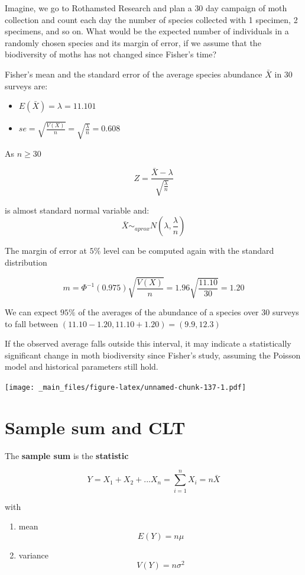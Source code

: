 \documentclass[
]{book}
\providecommand{\tightlist}{%
  \setlength{\itemsep}{0pt}\setlength{\parskip}{0pt}}
\begin{document}
Imagine, we go to Rothamsted Research and plan a \(30\) day campaign of moth collection and count each day the number of species collected with 1 specimen, 2 specimens, and so on. What would be the expected number of individuals in a randomly chosen species and its margin of error, if we assume that the biodiversity of moths has not changed since Fisher's time?

Fisher's mean and the standard error of the average species abundance \(\bar{X}\) in \(30\) surveys are:

\begin{itemize}
\tightlist
\item
  \(E(\bar{X})=\lambda=11.101\)
\item
  \(se=\sqrt{\frac{V(X)}{n}}=\sqrt{\frac{\lambda}{n}}=0.608\)
\end{itemize}

As \(n \geq 30\)

\[Z=\frac{\bar{X}-\lambda}{\sqrt{\frac{\lambda}{n}}}\]

is almost standard normal variable and: \[\bar{X} \sim_{aprox}  N(\lambda, \frac{\lambda}{n})\]

The margin of error at \(5\%\) level can be computed again with the standard distribution

\[m=\Phi^{-1}(0.975) \sqrt{\frac{V(X)}{n}}=1.96\sqrt{\frac{11.10}{30}}=1.20\]

We can expect \(95\%\) of the averages of the abundance of a species over \(30\) surveys to fall between
\((11.10-1.20, 11.10+1.20)= (9.9, 12.3)\)

If the observed average falls outside this interval, it may indicate a statistically significant change in moth biodiversity since Fisher's study, assuming the Poisson model and historical parameters still hold.

\texttt{[image: \_main\_files/figure-latex/unnamed-chunk-137-1.pdf]}

\hypertarget{sample-sum-and-clt}{%
\section{Sample sum and CLT}\label{sample-sum-and-clt}}

The \textbf{sample sum} is the \textbf{statistic}

\[Y=X_1+X_2+...X_n=\sum_{i=1}^n X_i=n \bar{X}\]

with

\begin{enumerate}
\def\labelenumi{\arabic{enumi})}
\tightlist
\item
  mean \[E(Y)=n\mu\]
\item
  variance \[V(Y)=n\sigma^2\]
\end{enumerate}
\end{document}
